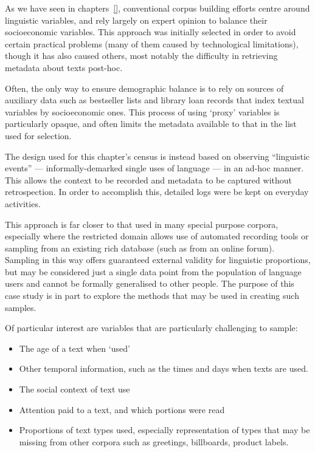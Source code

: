 As we have seen in chapters~\ref{}, conventional corpus building efforts centre around linguistic variables, and rely largely on expert opinion to balance their socioeconomic variables.  This approach was initially selected in order to avoid certain practical problems (many of them caused by technological limitations), though it has also caused others, most notably the difficulty in retrieving metadata about texts post-hoc.

Often, the only way to ensure demographic balance is to rely on sources of auxiliary data such as bestseller lists and library loan records that index textual variables by socioeconomic ones.  This process of using `proxy' variables is particularly opaque, and often limits the metadata available to that in the list used for selection.

The design used for this chapter's census is instead based on observing ``linguistic events'' --- informally-demarked single uses of language --- in an ad-hoc manner.  This allows the context to be recorded and metadata to be captured without retrospection.  In order to accomplish this, detailed logs were be kept on everyday activities.

This approach is far closer to that used in many special purpose corpora, especially where the restricted domain allows use of automated recording tools or sampling from an existing rich database (such as from an online forum).  Sampling in this way offers guaranteed external validity for linguistic proportions, but may be considered just a single data point from the population of language users and cannot be formally generalised to other people.  The purpose of this case study is in part to explore the methods that may be used in creating such samples.

Of particular interest are variables that are particularly challenging to sample:

\begin{itemize}
    \item The age of a text when `used'
    \item Other temporal information, such as the times and days when texts are used.
    \item The social context of text use
    \item Attention paid to a text, and which portions were read
    \item Proportions of text types used, especially representation of types that may be missing from other corpora such as greetings, billboards, product labels.
\end{itemize}

